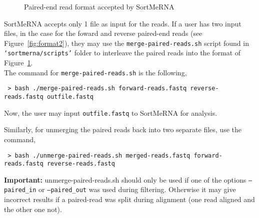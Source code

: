 \documentclass[10pt,a4paper]{article}
\begin{document}
\begin{figure}[here!]
\centering
{}%
\caption{Paired-end read format accepted by SortMeRNA}
\label{fig:format1}
\end{figure}

\noindent SortMeRNA accepts only 1 file as input for the reads. If a user has two input files, in the case for the 
foward and reverse paired-end reads (see Figure~\ref{fig:format2}), they may use the \texttt{merge-paired-reads.sh} script found in 
\texttt{`sortmerna/scripts'} folder to interleave the paired reads into the format of Figure~\ref{fig:format1}.\\

\noindent The command for \texttt{merge-paired-reads.sh} is the following,
\begin{verbatim}
 > bash ./merge-paired-reads.sh forward-reads.fastq reverse-reads.fastq outfile.fastq
\end{verbatim}

\noindent Now, the user may input \texttt{outfile.fastq} to SortMeRNA for analysis.

\noindent Similarly, for unmerging the paired reads back into two separate files, use the command,
{\small
\begin{verbatim}
 > bash ./unmerge-paired-reads.sh merged-reads.fastq forward-reads.fastq reverse-reads.fastq 
\end{verbatim}}
{\bf Important:} unmerge-paired-reads.sh should only be used if one of the options {\tt--paired\_in} or {\tt--paired\_out}
was used during filtering. Otherwise it may give incorrect results if a paired-read was split during alignment (one
read aligned and the other one not).
\end{document}
